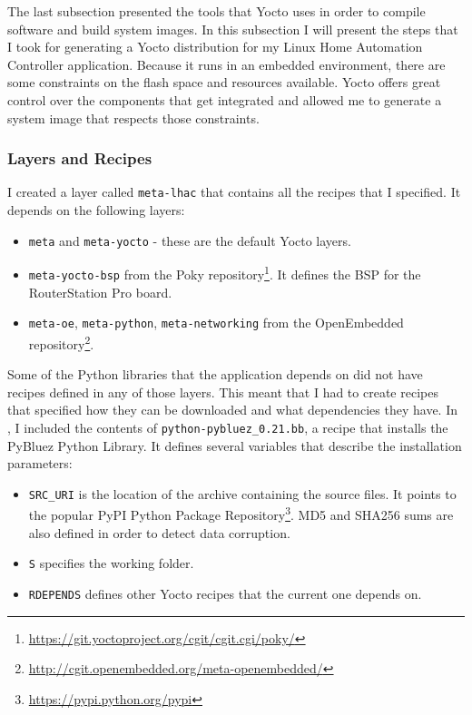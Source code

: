 The last subsection presented the tools that Yocto uses in order to compile software and build system images. In this subsection I will present the steps that I took for generating a Yocto distribution for my Linux Home Automation Controller application. Because it runs in an embedded environment, there are some constraints on the flash space and resources available. Yocto offers great control over the components that get integrated and allowed me to generate a system image that respects those constraints.

\subsubsection{Layers and Recipes}

I created a layer called \texttt{meta-lhac} that contains all the recipes that I specified. It depends on the following layers:
\begin{itemize}
  \item \texttt{meta} and \texttt{meta-yocto} - these are the default Yocto layers.
  \item \texttt{meta-yocto-bsp} from the Poky repository\footnote{\url{https://git.yoctoproject.org/cgit/cgit.cgi/poky/}}. It defines the BSP for the RouterStation Pro board.
  \item \texttt{meta-oe}, \texttt{meta-python}, \texttt{meta-networking} from the OpenEmbedded repository\footnote{\url{http://cgit.openembedded.org/meta-openembedded/}}.
\end{itemize}

Some of the Python libraries that the application depends on did not have recipes defined in any of those layers. This meant that I had to create recipes that specified how they can be downloaded and what dependencies they have. In , I included the contents of \texttt{python-pybluez_0.21.bb}, a recipe that installs the PyBluez Python Library. It defines several variables that describe the installation parameters:
\begin{itemize}
  \item \texttt{SRC_URI} is the location of the archive containing the source files. It points to the popular PyPI Python Package Repository\footnote{\url{https://pypi.python.org/pypi}}. MD5 and SHA256 sums are also defined in order to detect data corruption.
  \item \texttt{S} specifies the working folder.
  \item \texttt{RDEPENDS} defines other Yocto recipes that the current one depends on.
\end{itemize}

